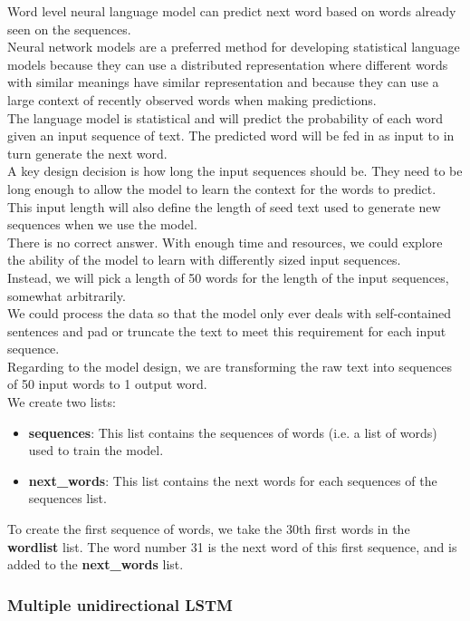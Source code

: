 \documentclass[hidelinks, conference]{IEEEtran}
\begin{document}
Word level neural language model can predict next word based on words already seen on the sequences.\\
Neural network models are a preferred method for developing statistical language models because they can use a distributed representation where different words with similar meanings have similar representation and because they can use a large context of recently observed words when making predictions.\\
The language model is statistical and will predict the probability of each word given an input sequence of text. The predicted word will be fed in as input to in turn generate the next word.\\
A key design decision is how long the input sequences should be. They need to be long enough to allow the model to learn the context for the words to predict. This input length will also define the length of seed text used to generate new sequences when we use the model.\\
There is no correct answer. With enough time and resources, we could explore the ability of the model to learn with differently sized input sequences.\\
Instead, we will pick a length of 50 words for the length of the input sequences, somewhat arbitrarily.\\
We could process the data so that the model only ever deals with self-contained sentences and pad or truncate the text to meet this requirement for each input sequence.\\
Regarding to the model design, we are transforming the raw text into sequences of 50 input words to 1 output word.\\

We create two lists:

\begin{itemize}
\item \textbf{sequences}: This list contains the sequences of words (i.e. a list of words) used to train the model.
\item \textbf{next\_words}: This list contains the next words for each sequences of the sequences list.
\end{itemize}

To create the first sequence of words, we take the 30th first words in the \textbf{wordlist} list. The word number 31 is the next word of this first sequence, and is added to the \textbf{next\_words} list.

\subsubsection{Multiple unidirectional LSTM}\label{subsec_embedding_layer}
\end{document}
